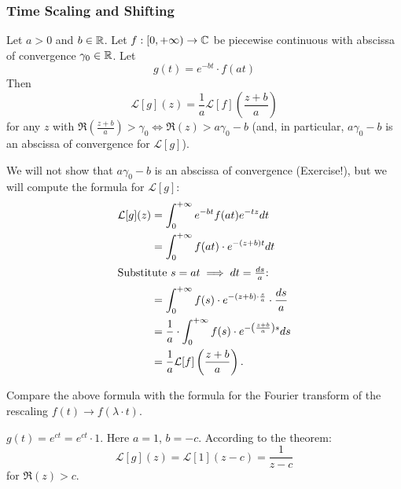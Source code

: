 \subsubsection{Time Scaling and Shifting}
\begin{theorem}
    Let $a > 0$ and $b \in \mathbb{R}$. Let $f: [0, +\infty) \to \mathbb{C}$ be piecewise continuous with abscissa of convergence $\gamma_0 \in \mathbb{R}$. Let
    \[
        g(t) = e^{-bt} \cdot f(at)
    \]
    Then
    \[
        \mathcal{L}[g](z) = \frac{1}{a}\mathcal{L}[f]\left(\frac{z+b}{a}\right)
    \]
    for any $z$ with $\Re\left(\frac{z+b}{a}\right) > \gamma_0 \iff \Re(z) > a\gamma_0 - b$ (and, in particular, $a\gamma_0 - b$ is an abscissa of convergence for $\mathcal{L}[g]$).
\end{theorem}

\begin{proofbox}
    We will not show that $a\gamma_0 - b$ is an abscissa of convergence (Exercise!), but we will compute the formula for $\mathcal{L}[g]$:
    \begin{align*}
        \mathcal{L}[g](z) &= \int_{0}^{+\infty} e^{-bt}f(at)e^{-tz} dt \\
        &= \int_{0}^{+\infty} f(at) \cdot e^{-(z+b)t} dt \\
        \intertext{Substitute $s = at \implies dt = \frac{ds}{a}$:}
        &= \int_{0}^{+\infty} f(s) \cdot e^{-(z+b) \cdot \frac{s}{a}} \cdot \frac{ds}{a} \\
        &= \frac{1}{a} \cdot \int_{0}^{+\infty} f(s) \cdot e^{-\left(\frac{z+b}{a}\right)s} ds \\
        &= \frac{1}{a}\mathcal{L}[f]\left(\frac{z+b}{a}\right).
    \end{align*}
\end{proofbox}

\begin{remark}[Remark]
    Compare the above formula with the formula for the Fourier transform of the rescaling $f(t) \to f(\lambda \cdot t)$.
\end{remark}

\begin{example}[Example]
    $g(t) = e^{ct} = e^{ct} \cdot 1$. Here $a = 1$, $b = -c$. According to the theorem:
    \[
        \mathcal{L}[g](z) = \mathcal{L}[1](z - c) = \frac{1}{z - c}
    \]
    for $\Re(z) > c$.
\end{example}

